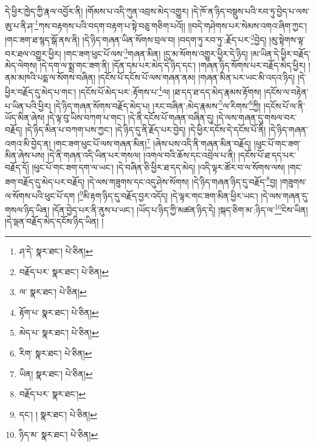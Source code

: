 དེ་ཕྱིར་ཁྱེད་ཀྱི་རྣལ་འབྱོར་ནི། །གོམས་པ་འདི་ཀུན་འབྲས་མེད་འགྱུར། །དེ་ཁོ་ན་ཉིད་བསྡུས་པའི་རབ་ཏུ་བྱེད་པ་ལས་ཨུ་པ་ནི་ཤ་\footnote{ཤ་དེ་  སྣར་ཐང་།  པེ་ཅིན། }ཀས་བརྟགས་པའི་བདག་བརྟག་པ་སྟེ་བཅུ་གཅིག་པའོ།། །།བདེ་གཤེགས་པར་སེམས་འགའ་ཞིག་ཀྱང་། །གང་ཟག་ཐ་སྙད་སྒོ་ནས་ནི། །དེ་ཉིད་གཞན་ཡིན་སོགས་བྲལ་བ། །བདག་ཏུ་རབ་ཏུ་:རྗོད་པར་\footnote{བརྗོད་པར་  སྣར་ཐང་།  པེ་ཅིན། }བྱེད། །མུ་སྟེགས་ལྟ་བར་ཐལ་འགྱུར་ཕྱིར། །གང་ཟག་ཕུང་པོ་ལས་\footnote{ལ་  སྣར་ཐང་།  པེ་ཅིན། }གཞན་མིན། །དུ་མ་སོགས་འགྱུར་ཕྱིར་དེ་ཉིད། །མ་ཡིན་དེ་ཕྱིར་བརྗོད་མེད་ལེགས། །དེ་དག་ལ་སྨྲ་གང་ཟག་ནི། །དོན་དམ་པར་མེད་དེ་ཉིད་དང་། །གཞན་ཉིད་སོགས་པར་བརྗོད་མེད་ཕྱིར། །ནམ་མཁའི་པདྨ་ལ་སོགས་བཞིན། །དངོས་པོ་དངོས་པོ་ལས་གཞན་ནམ། །གཞན་མིན་པར་ཡང་མི་འདའ་ཉིད། །དེ་ཕྱིར་བརྗོད་དུ་མེད་པ་གང་། །དངོས་པོ་མེད་པར་:རྟོགས་པ་\footnote{རྟོག་པ་  སྣར་ཐང་།  པེ་ཅིན། }ལ། །ཐ་དད་ཐ་དད་མེད་རྣམས་རྟོགས། །དངོས་ལ་བརྟེན་པ་ཡིན་པའི་ཕྱིར། །དེ་ཉིད་གཞན་སོགས་བརྗོད་མེད་པ། །རང་བཞིན་:མེད་རྣམས་\footnote{མེད་པ་  སྣར་ཐང་།  པེ་ཅིན། }ལ་རིགས་\footnote{རིག་  སྣར་ཐང་།  པེ་ཅིན། }ཀྱི། །དངོས་པོ་ལ་ནི་ཡོད་མིན་ཞེས། །དེ་ལྟ་བུ་ཡིས་བཀག་པ་གང་། །དེ་ནི་དངོས་པོ་གཞན་བཞིན་དུ། །དེ་ལས་གཞན་དུ་གསལ་བར་བརྗོད། །དེ་ཉིད་མིན་པ་བཀག་པས་ཀྱང་། །དེ་ཉིད་དུ་ནི་རྗོད་པར་བྱེད། །དེ་ཕྱིར་དངོས་དེ་དངོས་པོ་ནི། །དེ་ཉིད་གཞན་འགའ་མི་བྱེད་ན། །གང་ཟག་ཕུང་པོ་ལས་གཞན་མིན།\footnote{ཡིན།  སྣར་ཐང་།  པེ་ཅིན། } །ཞེས་པས་འདི་ནི་གཞན་མིན་བརྗོད། །ཕུང་པོ་གང་ཟག་མིན་ཞེས་པས། །དེ་ནི་གཞན་འདི་ཡིན་པར་གསལ། །འགལ་བའི་ཆོས་དང་འབྲེལ་པ་ནི། །དངོས་པོ་ཐ་དད་པར་བརྗོད་དོ། །ཕུང་པོ་གང་ཟག་དག་ལ་ཡང་། །དེ་བཞིན་ཅི་ཕྱིར་ཐ་དད་མེད། །འདི་ལྟར་ཚོར་བ་ལ་སོགས་ལས། །གང་ཟག་བརྗོད་དུ་མེད་པར་བརྗོད། །དེ་ལས་གཟུགས་དང་འདུ་ཤེས་སོགས། །དེ་ཉིད་གཞན་ཉིད་དུ་བརྗོད་\footnote{བརྗོད་པར་  སྣར་ཐང་། }བྱ། །གཟུགས་ལ་སོགས་པའི་ཕུང་པོ་དག །\footnote{དང་། །  སྣར་ཐང་།  པེ་ཅིན། }མི་རྟག་ཉིད་དུ་བརྗོད་བྱར་འདོད། །དེ་ལྟར་གང་ཟག་མིན་ཕྱིར་ཡང་། །དེ་ལས་གཞན་དུ་གསལ་ཉིད་ཡིན། །དོན་བྱེད་པར་ནི་ནུས་པ་ཡང་། །ཡོད་པ་ཉིད་ཀྱི་མཚན་ཉིད་དེ། །སྐད་ཅིག་མ་:ཉིད་ལ་\footnote{ཉིད་མ་  སྣར་ཐང་།  པེ་ཅིན། }ངེས་ཡིན། །དེ་ལྡན་བརྗོད་མེད་དངོས་ཉིད་ཡིན། །
